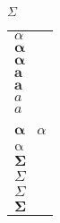 \documentclass{standalone}
\begin{document}
\ensuremath{\boldsymbol{\mathit{\Sigma}}}

\begin{tabular}{l}
$ \alpha$  \\
$ \boldsymbol{\alpha} $ \\
$ \mathbf{\alpha} $ \\
$\boldsymbol{a}$ \\
$\mathbf{a}$ \\
$\boldsymbol{\mathit{a}}$ \\
$\mathbf{\mathit{a}}$ \\
$ \bm{\alpha} $ \
$ \mathit{\alpha} $ \\
$ \mathrm{\alpha} $ \\
$ \mathit{\boldsymbol{\Sigma}} $ \\
$ \boldsymbol{\mathit{\Sigma}}$ \\
$ \bm{\mathit{\Sigma}}$ \\
$ \mathit{\bm{\Sigma}}$ \\
\end{tabular}
\end{document}
